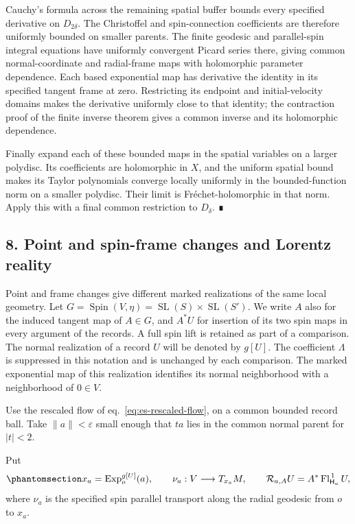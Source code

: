 \documentclass[
  english,
  11pt,
  reqno]{amsart}
\begin{document}
Cauchy's formula across the remaining spatial buffer bounds every
specified derivative on \(D_{2\delta}\). The Christoffel and
spin-connection coefficients are therefore uniformly bounded on smaller
parents. The finite geodesic and parallel-spin integral equations have
uniformly convergent Picard series there, giving common
normal-coordinate and radial-frame maps with holomorphic parameter
dependence. Each based exponential map has derivative the identity in
its specified tangent frame at zero. Restricting its endpoint and
initial-velocity domains makes the derivative uniformly close to that
identity; the contraction proof of the finite inverse theorem gives a
common inverse and its holomorphic dependence.

Finally expand each of these bounded maps in the spatial variables on a
larger polydisc. Its coefficients are holomorphic in \(X\), and the
uniform spatial bound makes its Taylor polynomials converge locally
uniformly in the bounded-function norm on a smaller polydisc. Their
limit is Fréchet-holomorphic in that norm. Apply this with a final
common restriction to \(D_\delta\). ∎

\protect{}\label{sec:es-naturality}

\subsection{8. Point and spin-frame changes and Lorentz
reality}\label{point-and-spin-frame-changes-and-lorentz-reality}

Point and frame changes give different marked realizations of the same
local geometry. Let
\(G=\operatorname{Spin}(V,\eta)=\operatorname{SL}(S)\times\operatorname{SL}(S')\).
We write \(A\) also for the induced tangent map of \(A\in G\), and
\(A^*U\) for insertion of its two spin maps in every argument of the
records. A full spin lift is retained as part of a comparison. The
normal realization of a record \(U\) will be denoted by \(g[U]\). The
coefficient \(\Lambda\) is suppressed in this notation and is unchanged
by each comparison. The marked exponential map of this realization
identifies its normal neighborhood with a neighborhood of \(0\in V\).

Use the rescaled flow of eq.~\ref{eq:es-rescaled-flow}, on a common
bounded record ball. Take \(\|a\|<\varepsilon\) small enough that \(ta\)
lies in the common normal parent for \(|t|<2\).

Put
\begin{equation}\protect\phantomsection\label{eq:es-point-frame-action}{
 x_a=\operatorname{Exp}^{g[U]}_o(a),\qquad
 \nu_a:V\longrightarrow T_{x_a}M,
 \qquad
 \mathcal R_{a,A}U
 =A^*\operatorname{Fl}_{\mathsf H_a}^{\,1}U,
}\end{equation} where \(\nu_a\) is the specified spin parallel transport
along the radial geodesic from \(o\) to \(x_a\).
\end{document}
